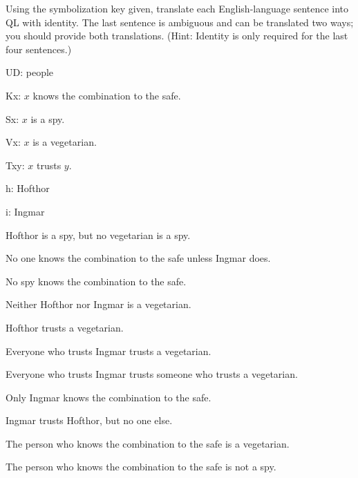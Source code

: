 \problempart
Using the symbolization key given, translate each English-language sentence into QL with identity. The last sentence is ambiguous and can be translated two ways; you should provide both translations. (Hint: Identity is only required for the last four sentences.)
\begin{ekey}
\item[UD:] people
\item[Kx:] $x$ knows the combination to the safe.
\item[Sx:] $x$ is a spy.
\item[Vx:] $x$ is a vegetarian.
\item[Txy:] $x$ trusts $y$.
\item[h:] Hofthor
\item[i:] Ingmar
\end{ekey}
\begin{earg}
\item Hofthor is a spy, but no vegetarian is a spy.
\item No one knows the combination to the safe unless Ingmar does.
\item No spy knows the combination to the safe.
\item Neither Hofthor nor Ingmar is a vegetarian.
\item Hofthor trusts a vegetarian.
\item Everyone who trusts Ingmar trusts a vegetarian.
\item Everyone who trusts Ingmar trusts someone who trusts a vegetarian.
\item Only Ingmar knows the combination to the safe.
\item Ingmar trusts Hofthor, but no one else.
\item The person who knows the combination to the safe is a vegetarian.
\item The person who knows the combination to the safe is not a spy.
\end{earg}

